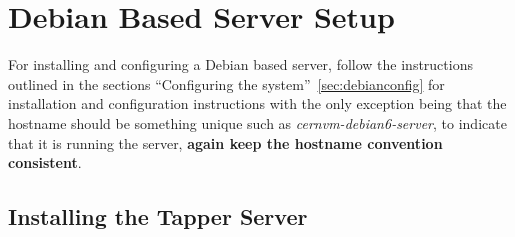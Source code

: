 \section{Debian Based Server Setup}
\label{sec:debianserver}
\flushleft

For installing and configuring a Debian based server, follow the instructions outlined in the sections ``Configuring the
system''~\ref{sec:debianconfig} for installation and configuration instructions with the only exception being that the
hostname should be something unique such as \emph{cernvm-debian6-server}, to indicate that it is running the \tapper server,
{\bf again keep the hostname convention consistent}.




\subsection{Installing the Tapper Server}
